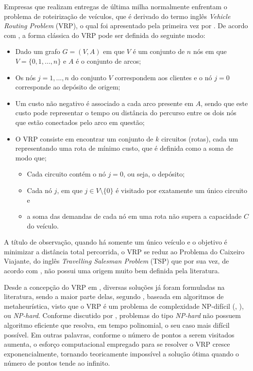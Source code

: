 Empresas que realizam entregas de última milha normalmente enfrentam o problema de roteirização de veículos, que é derivado do termo inglês \textit{Vehicle Routing Problem} (VRP), o qual foi apresentado pela primeira vez por .
De acordo com , a forma clássica do VRP pode ser definida do seguinte modo: 

\singlespacing
\begin{tcolorbox}
\begin{itemize}
    \item Dado um grafo $G=(V,A)$ em que $V$ é um conjunto de $n$ nós em que $V=\{0,1,...,n\}$ e $A$ é o conjunto de arcos;
    \item Os nós $j=1,..., n$ do conjunto $V$ correspondem aos clientes e o nó $j=0$ corresponde ao depósito de origem;
    \item Um custo não negativo é associado a cada arco presente em $A$, sendo que este custo pode representar o tempo ou distância do percurso entre os dois nós que estão conectados pelo arco em questão;
    \item O VRP consiste em encontrar um conjunto de $k$ circuitos (rotas), cada um representando uma rota de mínimo custo, que é definida como a soma de modo que;
    \begin{itemize}
        \item Cada circuito contém o nó $j=0$, ou seja, o depósito;
        \item Cada nó $j$, em que $j \in V\setminus\{0\}$ é visitado por exatamente um único circuito e
        \item a soma das demandas de cada nó em uma rota não supera a capacidade $C$ do veículo.
    \end{itemize}
\end{itemize}
\end{tcolorbox}
\onehalfspacing

A título de observação, quando há somente um único veículo e o objetivo é minimizar a distância total percorrida, o VRP se reduz ao Problema do Caixeiro Viajante, do inglês \textit{Travelling Salesman Problem} (TSP) que por sua vez, de acordo com , não possui uma origem muito bem definida pela literatura. 

Desde a concepção do VRP em \citeyear{dantzig1959truck}, diversas soluções já foram formuladas na literatura, sendo a maior parte delas, segundo , baseada em algoritmos de metaheurística, visto que o VRP é um problema de complexidade NP-difícil (, \citeyear{garey1976some}), ou \textit{NP-hard}.
Conforme discutido por , problemas do tipo \textit{NP-hard} não possuem algoritmo eficiente que resolva, em tempo polinomial, o seu caso mais difícil possível. 
Em outras palavras, conforme o número de pontos a serem visitados aumenta, o esforço computacional empregado para se resolver o VRP cresce exponencialmente, tornando teoricamente impossível a solução ótima quando o número de pontos tende ao infinito. 

